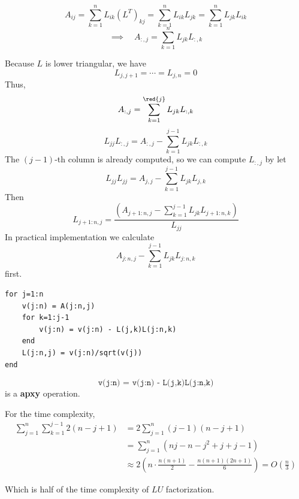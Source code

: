\[
    A_{ij} = \sum_{k=1}^{n} L_{ik} {(L^T)}_{kj} = \sum_{k=1}^{n} L_{ik} L_{jk} = \sum_{k=1}^{n} L_{jk} L_{ik}
\]
\[
    \implies \quad A_{:,j} = \sum_{k=1}^{n} L_{jk} L_{:,k}
\]

Because $L$ is lower triangular, we have \[
    L_{j,j+1} = \cdots = L_{j,n} = 0
\]
Thus, \[
    A_{:,j} = \sum_{k=1}^{\red{j}} L_{jk} L_{:,k}
\]
\[
    L_{jj} L_{:,j} = A_{:,j} - \sum_{k=1}^{j-1} L_{jk} L_{:,k}
\]
The $(j-1)$-th column is already computed, so we can compute $L_{:,j}$ by let \[
    L_{jj} L_{jj} = A_{j,j} - \sum_{k=1}^{j-1} L_{jk} L_{j,k}
\]
Then \[
    L_{j+1:n, j} = \frac{\displaystyle (A_{j+1:n, j} - \sum_{k=1}^{j-1} L_{jk} L_{j+1:n, k})}{L_{jj}}
\]
In practical implementation we calculate \[
    A_{j:n, j} - \sum_{k=1}^{j-1} L_{jk} L_{j:n, k}
\]
first.

\begin{verbatim}
for j=1:n
    v(j:n) = A(j:n,j)
    for k=1:j-1
        v(j:n) = v(j:n) - L(j,k)L(j:n,k)
    end
    L(j:n,j) = v(j:n)/sqrt(v(j))
end
\end{verbatim}

\begin{note}
    \[
        \texttt{v(j:n) = v(j:n) - L(j,k)L(j:n,k)}
    \]
    is a \textbf{apxy} operation.   
\end{note}

For the time complexity, \begin{align*}
    \sum_{j=1}^{n} \sum_{k=1}^{j-1} 2(n-j+1) &= 2\sum_{j=1}^{n} (j-1)(n-j+1) \\[3pt]
    &= \sum_{j=1}^{n} (nj - n -j^2 +j + j - 1) \\[3pt]
    &\approx 2(n \cdot \frac{n(n+1)}{2} - \frac{n(n+1)(2n+1)}{6}) = O \left(\frac{n}{3}\right)
\end{align*}

Which is half of the time complexity of $LU$ factorization.